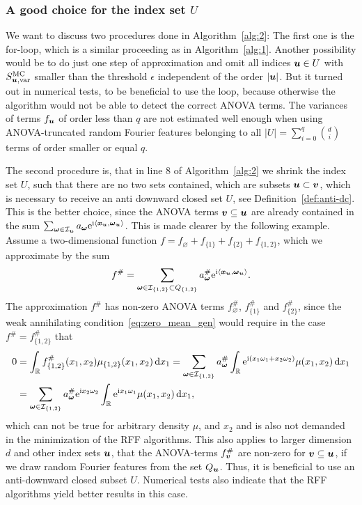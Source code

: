 \documentclass{article}
\renewcommand{\vec}[1]{\ensuremath \mathbf{\boldsymbol{#1}}}
\newcommand{\w}{\ensuremath{\vec \omega}}
\newcommand{\x}{\ensuremath{\vec x}}
\newcommand{\I}{\ensuremath{\mathcal{I}}}
\newcommand{\R}{\ensuremath{\mathbb{R}}}
\newcommand{\dx}{\mathrm{d}}
\newcommand{\e}{\mathrm{e}}
\newcommand{\im}{\mathrm{i}}
\theoremstyle{definition}
\numberwithin{equation}{section}
\begin{document}
\subsubsection*{A good choice for the index set $U$}
We want to discuss two procedures done in Algorithm~\ref{alg:2}: The first one is the for-loop, which is a similar proceeding as in Algorithm~\ref{alg:1}. Another possibility would be to do just one step of approximation and omit all indices $\vec u \in U$ with $S^{\text{MC}}_{\vec u,\text{var}}$ smaller than the threshold $\epsilon$ independent of the order $|\vec u|$. But it turned out in numerical tests, to be beneficial to use the loop, because otherwise the algorithm would not be able to detect the correct ANOVA terms. The variances of terms $f_{\vec u}$ of order less than $q$ are not estimated well enough when using ANOVA-truncated random Fourier features belonging to all $|U |= \sum_{i = 0}^q\binom{d}{i}$ terms of order smaller or equal $q$. \par  


The second procedure is, that in line $8$ of Algorithm~\ref{alg:2} we shrink the index set $U$, such that there are no two sets contained, which 
are subsets $\vec u \subset \vec v$, which is necessary to receive an anti downward closed set $U$, see Definition~\ref{def:anti-dc}. This is the 
better choice, since the ANOVA terms $\vec v \subseteq \vec u$ are already contained in the sum $\sum_{\w\in \I_{\vec u}}a_{\w}\e^{\im \langle \vec x_{\vec u},\w_{\vec u}\rangle}$. This is made clearer by the following example. Assume a two-dimensional function $f = f_{\varnothing} +f_{\{1\}} +f_{\{2\}} + f_{\{1,2\}}$, which we approximate by the sum
$$f^\# = \sum_{\w\in \I_{\{1,2\}}\subset Q_{\{1,2\}}} a^\#_{\w} \e^{\im \langle \x_{\vec u},  \w_{\vec u}\rangle}.$$  
The approximation $f^\#$ has non-zero ANOVA terms $f^\#_{\varnothing}$, $f^\#_{\{1\}}$ and  $f^\#_{\{2\}}$, since the weak annihilating condition~\eqref{eq:zero_mean_gen} would require in the case $f^\# = f^\#_{\{1,2\}}$ that
\begin{align*}
0&=\int_{\R} f^\#_{\{1,2\}}(x_1,x_2) \mu_{\{1,2\}}(x_1,x_2)\, \dx x_1
=\sum_{\w\in \I_{\{1,2\}}} a^\#_{\w} \int_{\R} \e^{\im \left( x_1\omega_1+ x_2\omega_2\right)} \mu(x_1,x_2)\, \dx x_1\\
&=\sum_{\w\in \I_{\{1,2\}}} a^\#_{\w}\e^{\im  x_2\omega_2} \int_{\R} \e^{\im x_1\omega_1} \mu(x_1,x_2)\, \dx x_1,
\end{align*}
which can not be true for arbitrary density $\mu$, and $x_2$ and is also not demanded in the minimization of the RFF algorithms. This also applies to larger dimension $d$ and other index sets $\vec u$, that the ANOVA-terms $f^\#_{\vec v}$ are non-zero for $\vec v\subseteq \vec u$, if we draw random Fourier features from the set $Q_{\vec u}$. Thus, it is beneficial to use an anti-downward closed subset $U$. Numerical tests also indicate that the RFF algorithms yield better results in this case. 
\end{document}
